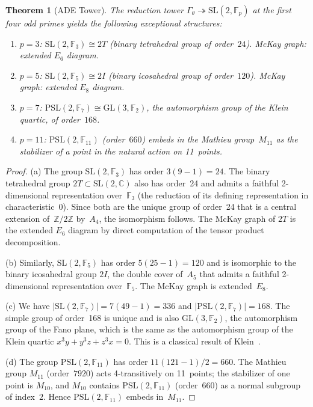 \documentclass[12pt]{amsart}
\newtheorem{theorem}{Theorem}[section]
\theoremstyle{definition}
\theoremstyle{remark}
\newcommand{\SL}{\mathrm{SL}}
\newcommand{\PSL}{\mathrm{PSL}}
\newcommand{\GL}{\mathrm{GL}}
\newcommand{\Fp}{\mathbb{F}_p}
\newcommand{\Z}{\mathbb{Z}}
\newcommand{\C}{\mathbb{C}}
\newcommand{\Gtheta}{\Gamma_\theta}
\begin{document}
\begin{theorem}[ADE Tower]\label{thm:ade}
The reduction tower $\Gtheta \twoheadrightarrow \SL(2,\Fp)$ at the
first four odd primes yields the following exceptional structures:
\begin{enumerate}[label=(\alph*)]
\item $p=3$: $\SL(2,\mathbb{F}_3) \cong 2T$ (binary tetrahedral group
of order~$24$).  McKay graph: extended $E_6$ diagram.
\item $p=5$: $\SL(2,\mathbb{F}_5) \cong 2I$ (binary icosahedral group
of order~$120$).  McKay graph: extended $E_8$ diagram.
\item $p=7$: $\PSL(2,\mathbb{F}_7) \cong \GL(3,\mathbb{F}_2)$, the
automorphism group of the Klein quartic, of order~$168$.
\item $p=11$: $\PSL(2,\mathbb{F}_{11})$ (order~$660$) embeds in the
Mathieu group~$M_{11}$ as the stabilizer of a point in the natural
action on 11~points.
\end{enumerate}
\end{theorem}

\begin{proof}
(a) The group $\SL(2,\mathbb{F}_3)$ has order $3(9-1) = 24$.  The
binary tetrahedral group $2T \subset \SL(2,\C)$ also has order~24 and
admits a faithful 2-dimensional representation over~$\mathbb{F}_3$
(the reduction of its defining representation in characteristic~0).
Since both are the unique group of order~24 that is a central extension
of~$\Z/2\Z$ by~$A_4$, the isomorphism follows.  The McKay graph of
$2T$ is the extended $E_6$ diagram by direct computation of the tensor
product decomposition.

(b) Similarly, $\SL(2,\mathbb{F}_5)$ has order $5(25-1) = 120$ and is
isomorphic to the binary icosahedral group $2I$, the double cover
of~$A_5$ that admits a faithful 2-dimensional representation
over~$\mathbb{F}_5$.  The McKay graph is extended~$E_8$.

(c) We have $|\SL(2,\mathbb{F}_7)| = 7(49-1) = 336$ and
$|\PSL(2,\mathbb{F}_7)| = 168$.  The simple group of order~168 is
unique and is also $\GL(3,\mathbb{F}_2)$, the automorphism group of
the Fano plane, which is the same as the automorphism group of the
Klein quartic $x^3 y + y^3 z + z^3 x = 0$.  This is a classical result
of Klein~\cite{klein}.

(d) The group $\PSL(2,\mathbb{F}_{11})$ has order $11(121-1)/2 = 660$.
The Mathieu group $M_{11}$ (order~$7920$) acts 4-transitively on
11~points; the stabilizer of one point is $M_{10}$, and $M_{10}$ contains
$\PSL(2,\mathbb{F}_{11})$ (order~660) as a normal subgroup of
index~$2$.  Hence $\PSL(2,\mathbb{F}_{11})$ embeds in~$M_{11}$.
\end{proof}
\end{document}
